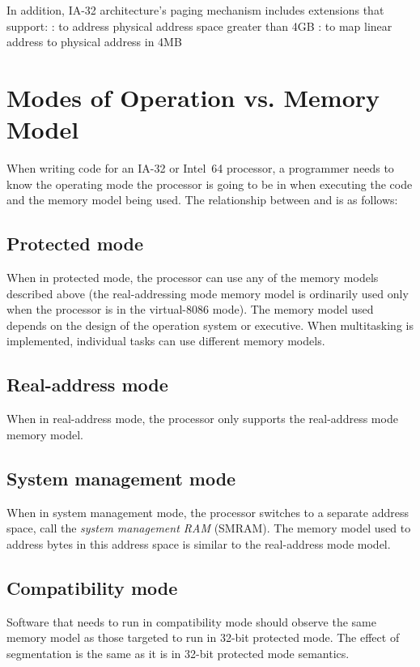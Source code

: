 In addition, IA-32 architecture's paging mechanism includes extensions that
support:
\bit
\w {}: to address physical address space
greater than 4GB
\w {}: to map linear address to physical address
in 4MB 
\eit

\section{Modes of Operation vs. Memory Model}
When writing code for an IA-32 or Intel~64 processor, a programmer needs to
know the operating mode the processor is going to be in when executing the
code and the memory model being used. 
The relationship between  and  is as
follows: 

\subsection{Protected mode}
When in protected mode, the processor can use any of the memory models
described above (the real-addressing mode memory model is ordinarily used only
when the processor is in the virtual-8086 mode). The memory model used depends
on the design of the operation system or executive. When multitasking is
implemented, individual tasks can use different memory models. 

\subsection{Real-address mode}
When in real-address mode, the processor only supports the real-address mode
memory model. 

\subsection{System management mode}
When in system management mode, the processor switches to a separate address
space, call the {\em system management RAM\/} (SMRAM). The memory model used
to address bytes in this address space is similar to the real-address mode
model. 

\subsection{Compatibility mode}
Software that needs to run in compatibility mode should observe the same
memory model as those targeted to run in 32-bit protected mode. The effect of
segmentation is the same as it is in 32-bit protected mode semantics. 

